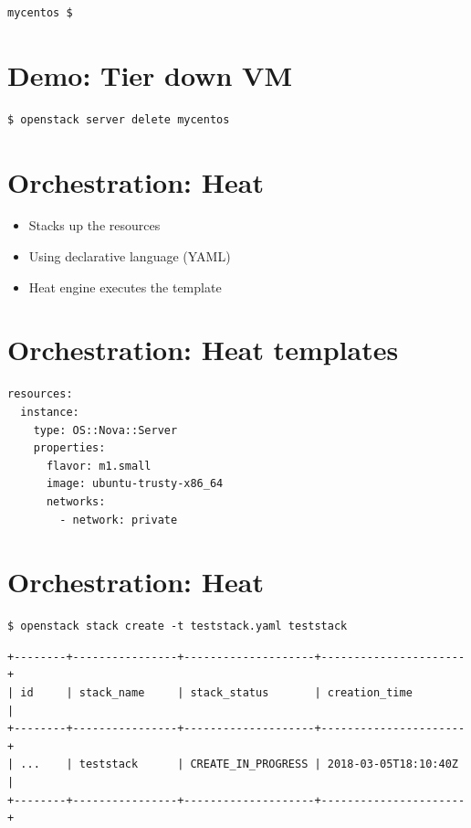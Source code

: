 \documentclass[11pt]{article}
\begin{document}
\begin{verbatim}
mycentos $
\end{verbatim}

\section*{Demo: Tier down VM}
\label{sec:orgfcb7a35}
\begin{verbatim}
$ openstack server delete mycentos
\end{verbatim}

\section*{Orchestration: Heat}
\label{sec:orgda9bf10}
\begin{itemize}
\item Stacks up the resources
\item Using declarative language (YAML)
\item Heat engine executes the template
\end{itemize}

\section*{Orchestration: Heat templates}
\label{sec:org8b4fc6c}
\begin{verbatim}
resources:
  instance:
    type: OS::Nova::Server
    properties:
      flavor: m1.small
      image: ubuntu-trusty-x86_64
      networks:
        - network: private
\end{verbatim}

\section*{Orchestration: Heat}
\label{sec:org2c8f98e}
\begin{verbatim}
$ openstack stack create -t teststack.yaml teststack
\end{verbatim}

\begin{verbatim}
+--------+----------------+--------------------+----------------------+
| id     | stack_name     | stack_status       | creation_time        |
+--------+----------------+--------------------+----------------------+
| ...    | teststack      | CREATE_IN_PROGRESS | 2018-03-05T18:10:40Z |
+--------+----------------+--------------------+----------------------+
\end{verbatim}
\end{document}
